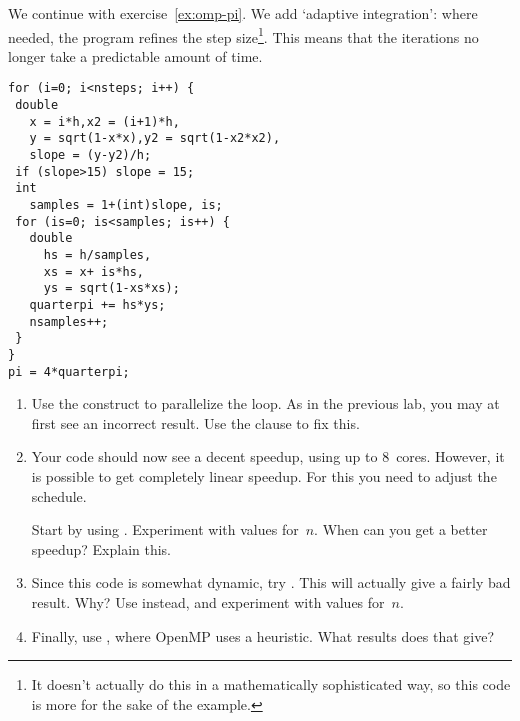 \begin{exercise}
  \label{ex:omp-pi-adapt}
  We continue with exercise~\ref{ex:omp-pi}.  We add `adaptive
  integration': where needed, the program refines the step
  size\footnote{It doesn't actually do this in a mathematically
    sophisticated way, so this code is more for the sake of the
    example.}.  This means that the iterations no longer take a
  predictable amount of time.

\begin{minipage}{.3\linewidth}\small
\begin{verbatim}
for (i=0; i<nsteps; i++) {
 double
   x = i*h,x2 = (i+1)*h,
   y = sqrt(1-x*x),y2 = sqrt(1-x2*x2),
   slope = (y-y2)/h;
 if (slope>15) slope = 15;
 int
   samples = 1+(int)slope, is;
 for (is=0; is<samples; is++) {
   double
     hs = h/samples,
     xs = x+ is*hs,
     ys = sqrt(1-xs*xs);
   quarterpi += hs*ys;
   nsamples++;
 }
}
pi = 4*quarterpi;
\end{verbatim}
\end{minipage}

\begin{enumerate}
\item Use the  construct to parallelize the loop.
  As in the previous lab, you may at first see an incorrect result.
  Use the  clause to fix this.
\item Your code should now see a decent speedup, using up to 8~cores.
  However, it is possible to get completely linear speedup. For this
  you need to adjust the schedule.

  Start by using . Experiment with values
  for~$n$.  When can you get a better speedup? Explain this.
\item Since this code is somewhat dynamic, try .
  This will actually give a fairly bad result. Why?  Use
   instead, and experiment with values
  for~$n$.
\item Finally, use , where OpenMP uses a
  heuristic.  What results does that give?
\end{enumerate}
     
\end{exercise}

